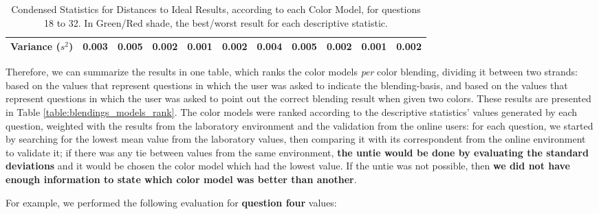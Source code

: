 \begin{itemize}
\begin{table}[htbp]
{\begin{tabular}{@{}ccccccccccc@{}}
      \multicolumn{1}{c|}{Variance ($s^2$)}                                         & \cellcolor[HTML]{FFFFFF}0.003         & \cellcolor[HTML]{FD6864}\textbf{0.005} & \cellcolor[HTML]{FFFFFF}0.002         & \cellcolor[HTML]{32CB00}\textbf{0.001} & \multicolumn{1}{c|}{\cellcolor[HTML]{FFFFFF}0.002}         & \cellcolor[HTML]{FFFFFF}0.004         & \cellcolor[HTML]{FD6864}\textbf{0.005} & \cellcolor[HTML]{FFFFFF}0.002         & \cellcolor[HTML]{32CB00}\textbf{0.001} & \multicolumn{1}{c|}{\cellcolor[HTML]{FFFFFF}0.002} \\ \bottomrule
    \end{tabular}}
    \caption[Condensed Statistics for Distances to Ideal Results, according to each Color Model, for questions 18 to 32.]{Condensed Statistics for Distances to Ideal Results, according to each Color Model, for questions 18 to 32. In Green/Red shade, the best/worst result for each descriptive statistic.}
    \label{table:colormodels_expectations_labonline_statistics}
  \end{table}
\end{itemize} \par
%
Therefore, we can summarize the results in one table, which ranks the color models \emph{per} color blending, dividing it between two strands: based on the values that represent questions in which the user was
asked to indicate the blending-basis, and based on the values that represent questions in which the user was asked to point out the correct blending result when given two colors. These results are presented in
Table \ref{table:blendings_models_rank}. The color models were ranked according to the descriptive statistics' values generated by each question, weighted with the results from the laboratory environment and the
validation from the online users: for each question, we started by searching for the lowest mean value from the laboratory values, then comparing it with its correspondent from the online environment to validate
it; if there was any tie between values from the same environment, \textbf{the untie would be done by evaluating the standard deviations} and it would be chosen the color model which had the lowest value. If the
untie was not possible, then \textbf{we did not have enough information to state which color model was better than another}. \par
%
For example, we performed the following evaluation for \textbf{question four} values:
%
